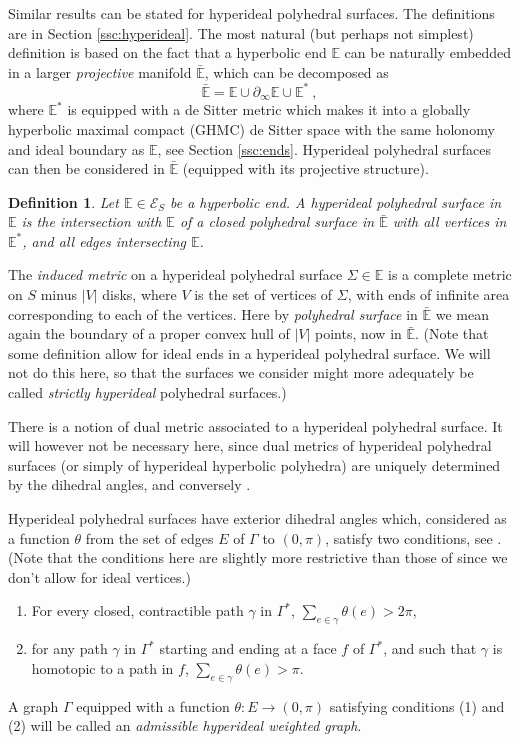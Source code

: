 \documentclass[notitlepage,twoside,a4paper]{amsart}
\newtheorem{definition}[theorem]{\rm\bf Definition}
\theoremstyle{named}
\newcommand{\bE}{{\mathbb E}}
\newcommand{\cE}{{\mathcal E}}
\begin{document}
Similar results can be stated for hyperideal polyhedral surfaces. The definitions are in Section \ref{ssc:hyperideal}. The most natural (but perhaps not simplest) definition is based on the fact that a hyperbolic end $\bE$ can be naturally embedded in a larger {\em projective} manifold $\bar \bE$, which can be decomposed as
$$ \bar \bE = \bE\cup \partial_\infty \bE \cup \bE^*~, $$
where $\bE^*$ is equipped with a de Sitter metric which makes it into a globally hyperbolic maximal compact (GHMC) de Sitter space with the same holonomy and ideal boundary as $\bE$, see Section \ref{ssc:ends}. Hyperideal polyhedral surfaces can then be considered in $\bar \bE$ (equipped with its projective structure). 


\begin{definition} \label{df:polyhyperideal}
  Let $\bE\in \cE_S$ be a hyperbolic end. A {\em hyperideal polyhedral surface} in $\bE$ is the intersection with $\bE$ of a closed polyhedral surface in $\bar \bE$ with all vertices in $\bE^*$, and all edges intersecting $\bE$.  
\end{definition}

The {\em induced metric} on a hyperideal  polyhedral surface $\Sigma\in \bE$ is a complete metric on $S$ minus $|V|$ disks, where $V$ is the set of vertices of $\Sigma$, with ends of infinite area corresponding to each of the vertices. Here by {\em polyhedral surface} in $\bar\bE$ we mean again the boundary of a proper convex hull of $|V|$ points, now in $\bar\bE$. (Note that some definition allow for ideal ends in a hyperideal polyhedral surface. We will not do this here, so that the surfaces we consider might more adequately be called {\em strictly hyperideal} polyhedral surfaces.)

There is a notion of dual metric associated to a hyperideal polyhedral surface. It will however not be necessary here, since dual metrics of hyperideal polyhedral surfaces (or simply of hyperideal hyperbolic polyhedra) are uniquely determined by the dihedral angles, and conversely \cite{rousset1}. 

Hyperideal polyhedral surfaces have exterior dihedral angles which, considered as a function $\theta$ from the set of edges $E$ of $\Gamma$ to $(0,\pi)$, satisfy two conditions, see \cite{bao-bonahon}. (Note that the conditions here are slightly more restrictive than those of \cite{bao-bonahon} since we don't allow for ideal vertices.)
\begin{enumerate}
\item For every closed, contractible path $\gamma$ in $\Gamma^*$, $\sum_{e\in \gamma}\theta(e)>2\pi$,
\item for any path $\gamma$ in $\Gamma^*$ starting and ending at a face $f$ of $\Gamma^*$, and such that $\gamma$ is homotopic to a path in $f$, $\sum_{e\in \gamma}\theta(e)>\pi$.
\end{enumerate}
A graph $\Gamma$ equipped with a function $\theta:E\to (0,\pi)$ satisfying conditions (1) and (2) will be called an {\em admissible hyperideal weighted graph}. 
\end{document}

